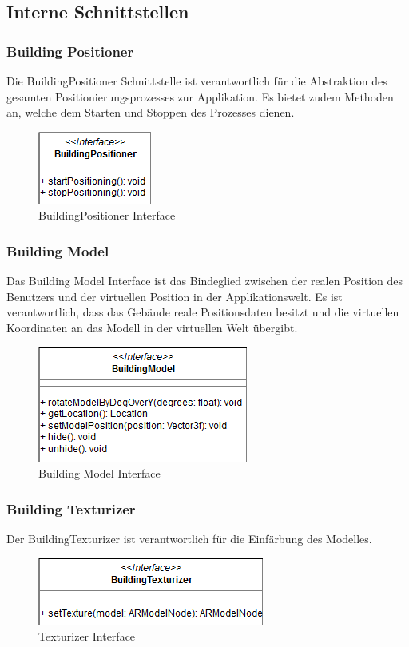 \documentclass[a4paper]{scrreprt}
\begin{document}
\subsection{Interne Schnittstellen}

\subsubsection{Building Positioner}
Die BuildingPositioner Schnittstelle ist verantwortlich für die Abstraktion des gesamten Positionierungsprozesses zur Applikation. Es bietet zudem Methoden an, welche dem Starten und Stoppen des Prozesses dienen.
\begin{figure}[h!]
	\center
	\includegraphics[scale=0.6]{BuildingPositioner.png}
	\caption{BuildingPositioner Interface}
\end{figure}
\clearpage
\subsubsection{Building Model}
Das Building Model Interface ist das Bindeglied zwischen der realen Position des Benutzers und der virtuellen Position in der Applikationswelt. Es ist verantwortlich, dass das Gebäude reale Positionsdaten besitzt und die virtuellen Koordinaten an das Modell in der virtuellen Welt übergibt.

\begin{figure}[h!]
	\center
	\includegraphics[scale=0.6]{BuildingModel.png}
	\caption{Building Model Interface}
\end{figure}

\subsubsection{Building Texturizer}
Der BuildingTexturizer ist verantwortlich für die Einfärbung des Modelles.
\begin{figure}[h!]
	\center
	\includegraphics[scale=0.6]{BuildingTexturizer.png}
	\caption{Texturizer Interface}
\end{figure}
\end{document}
